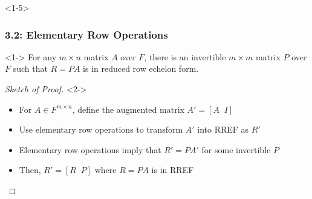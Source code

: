 \documentclass[10pt,english,aspectratio=169]{beamer}
\begin{document}
\begin{frame}<1-5> \frametitle{3.2: Elementary Row Operations}


\begin{lemma}<1->
For any $m\times n$ matrix $A$ over $F$, there is an invertible $m \times m$ matrix $P$ over $F$ such that $R=PA$ is in reduced row echelon form.
\end{lemma}

\vspace{3mm}

\begin{proof}[Sketch of Proof]<2->
\begin{itemize}
\item<2-> For $A\in F^{m \times n}$, define the augmented matrix $A' = [A \;\; I]$
\item<3-> Use elementary row operations to transform $A'$ into RREF as $R'$
\item<4-> Elementary row operations imply that $R' = P A'$ for some invertible $P$
\item<5-> Then, $R' = [R \;\; P]$ where $R=PA$ is in RREF \qedhere
\end{itemize}
\end{proof}


\end{frame}
\end{document}
